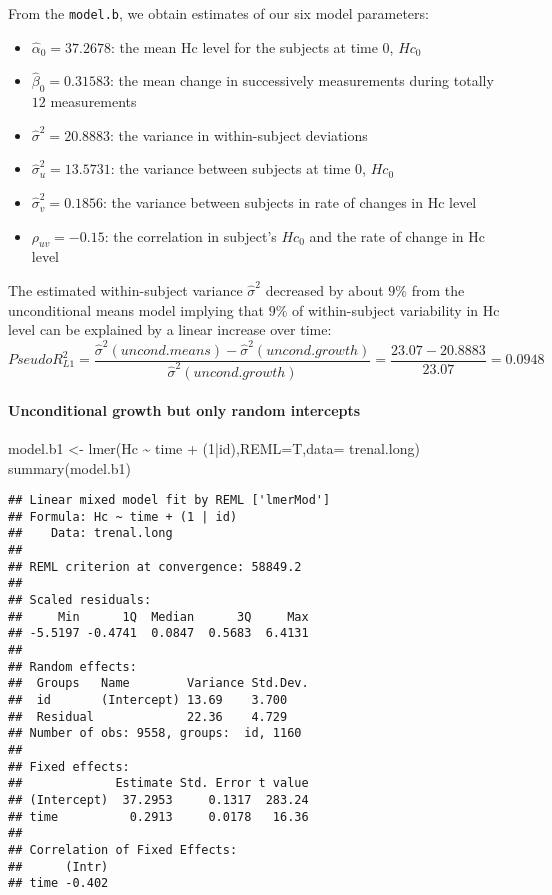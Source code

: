 \documentclass[
]{article}
\newenvironment{Shaded}{\begin{snugshade}}{\end{snugshade}}
\newcommand{\AttributeTok}[1]{\textcolor[rgb]{0.77,0.63,0.00}{#1}}
\newcommand{\DecValTok}[1]{\textcolor[rgb]{0.00,0.00,0.81}{#1}}
\newcommand{\FunctionTok}[1]{\textcolor[rgb]{0.00,0.00,0.00}{#1}}
\newcommand{\NormalTok}[1]{#1}
\newcommand{\OtherTok}[1]{\textcolor[rgb]{0.56,0.35,0.01}{#1}}
\newcommand{\SpecialCharTok}[1]{\textcolor[rgb]{0.00,0.00,0.00}{#1}}
\providecommand{\tightlist}{%
  \setlength{\itemsep}{0pt}\setlength{\parskip}{0pt}}
\begin{document}
From the \texttt{model.b}, we obtain estimates of our six model
parameters:

\begin{itemize}
\tightlist
\item
  \(\hat{\alpha}_0 = 37.2678\): the mean Hc level for the subjects at
  time 0, \(Hc_0\)
\item
  \(\hat{\beta}_0 = 0.31583\): the mean change in successively
  measurements during totally \(12\) measurements
\item
  \(\hat{\sigma}^2 = 20.8883\): the variance in within-subject
  deviations
\item
  \(\hat{\sigma}_u^2 = 13.5731\): the variance between subjects at time
  0, \(Hc_0\)
\item
  \(\hat{\sigma}_v^2 = 0.1856\): the variance between subjects in rate
  of changes in Hc level
\item
  \(\rho_{uv} = -0.15\): the correlation in subject's \(Hc_0\) and the
  rate of change in Hc level
\end{itemize}

The estimated within-subject variance \(\hat{\sigma}^2\) decreased by
about \(9\%\) from the unconditional means model implying that \(9\%\)
of within-subject variability in Hc level can be explained by a linear
increase over time:
\[Pseudo R^2_{L1} = \frac{\hat{\sigma}^2(uncond. means)-\hat{\sigma}^2(uncond. growth)}{\hat{\sigma}^2(uncond. growth)} = \frac{23.07-20.8883}{23.07} = 0.0948\]

\hypertarget{unconditional-growth-but-only-random-intercepts}{%
\paragraph{Unconditional growth but only random
intercepts}\label{unconditional-growth-but-only-random-intercepts}}

\begin{Shaded}
\begin{Highlighting}[]
\NormalTok{model.b1 }\OtherTok{\textless{}{-}} \FunctionTok{lmer}\NormalTok{(Hc }\SpecialCharTok{\textasciitilde{}}\NormalTok{ time }\SpecialCharTok{+}\NormalTok{ (}\DecValTok{1}\SpecialCharTok{|}\NormalTok{id),}\AttributeTok{REML=}\NormalTok{T,}\AttributeTok{data=}\NormalTok{ trenal.long)}
\FunctionTok{summary}\NormalTok{(model.b1)}
\end{Highlighting}
\end{Shaded}

\begin{verbatim}
## Linear mixed model fit by REML ['lmerMod']
## Formula: Hc ~ time + (1 | id)
##    Data: trenal.long
## 
## REML criterion at convergence: 58849.2
## 
## Scaled residuals: 
##     Min      1Q  Median      3Q     Max 
## -5.5197 -0.4741  0.0847  0.5683  6.4131 
## 
## Random effects:
##  Groups   Name        Variance Std.Dev.
##  id       (Intercept) 13.69    3.700   
##  Residual             22.36    4.729   
## Number of obs: 9558, groups:  id, 1160
## 
## Fixed effects:
##             Estimate Std. Error t value
## (Intercept)  37.2953     0.1317  283.24
## time          0.2913     0.0178   16.36
## 
## Correlation of Fixed Effects:
##      (Intr)
## time -0.402
\end{verbatim}
\end{document}
